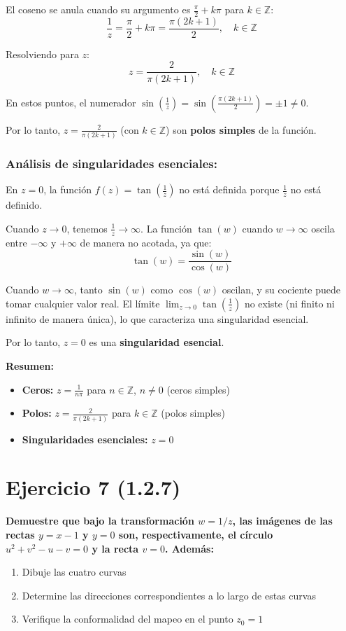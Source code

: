 \documentclass{article}
\begin{document}
El coseno se anula cuando su argumento es $\frac{\pi}{2} + k\pi$ para $k \in \mathbb{Z}$:
$$\frac{1}{z} = \frac{\pi}{2} + k\pi = \frac{\pi(2k + 1)}{2}, \quad k \in \mathbb{Z}$$

Resolviendo para $z$:
$$z = \frac{2}{\pi(2k + 1)}, \quad k \in \mathbb{Z}$$

En estos puntos, el numerador $\sin\left(\frac{1}{z}\right) = \sin\left(\frac{\pi(2k + 1)}{2}\right) = \pm 1 \neq 0$.

Por lo tanto, $z = \frac{2}{\pi(2k + 1)}$ (con $k \in \mathbb{Z}$) son \textbf{polos simples} de la función.

\subsubsection*{Análisis de singularidades esenciales:}

En $z = 0$, la función $f(z) = \tan\left(\frac{1}{z}\right)$ no está definida porque $\frac{1}{z}$ no está definido.

Cuando $z \to 0$, tenemos $\frac{1}{z} \to \infty$. La función $\tan(w)$ cuando $w \to \infty$ oscila entre $-\infty$ y $+\infty$ de manera no acotada, ya que:
$$\tan(w) = \frac{\sin(w)}{\cos(w)}$$

Cuando $w \to \infty$, tanto $\sin(w)$ como $\cos(w)$ oscilan, y su cociente puede tomar cualquier valor real. El límite $\lim_{z \to 0} \tan\left(\frac{1}{z}\right)$ no existe (ni finito ni infinito de manera única), lo que caracteriza una singularidad esencial.

Por lo tanto, $z = 0$ es una \textbf{singularidad esencial}.

\textbf{Resumen:}
\begin{itemize}
\item \textbf{Ceros:} $z = \frac{1}{n\pi}$ para $n \in \mathbb{Z}$, $n \neq 0$ (ceros simples)
\item \textbf{Polos:} $z = \frac{2}{\pi(2k + 1)}$ para $k \in \mathbb{Z}$ (polos simples)
\item \textbf{Singularidades esenciales:} $z = 0$
\end{itemize}

\newpage
\section*{Ejercicio 7 (1.2.7)}

\textbf{Demuestre que bajo la transformación $w = 1/z$, las imágenes de las rectas $y = x - 1$ y $y = 0$ son, respectivamente, el círculo $u^2 + v^2 - u - v = 0$ y la recta $v = 0$. Además:}
\begin{enumerate}
\item Dibuje las cuatro curvas
\item Determine las direcciones correspondientes a lo largo de estas curvas
\item Verifique la conformalidad del mapeo en el punto $z_0 = 1$
\end{enumerate}
\end{document}
